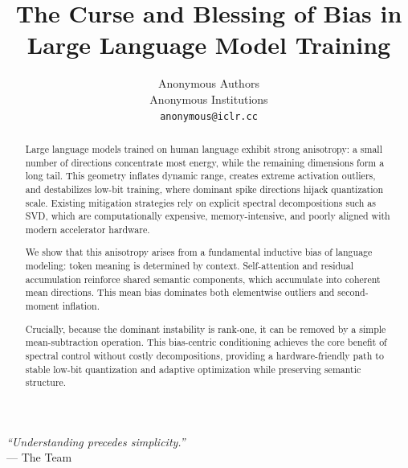 \documentclass{article}
\title{The Curse and Blessing of Bias in Large Language Model Training}
\author{
  Anonymous Authors\\
  Anonymous Institutions\\
  \texttt{anonymous@iclr.cc}
}
\begin{document}
\maketitle

\begin{abstract}

Large language models trained on human language exhibit strong anisotropy: a small number of directions concentrate most energy, while the remaining dimensions form a long tail. This geometry inflates dynamic range, creates extreme activation outliers, and destabilizes low-bit training, where dominant spike directions hijack quantization scale. Existing mitigation strategies rely on explicit spectral decompositions such as SVD, which are computationally expensive, memory-intensive, and poorly aligned with modern accelerator hardware.

We show that this anisotropy arises from a fundamental inductive bias of language modeling: token meaning is determined by context. Self-attention and residual accumulation reinforce shared semantic components, which accumulate into coherent mean directions. This mean bias dominates both elementwise outliers and second-moment inflation.

Crucially, because the dominant instability is rank-one, it can be removed by a simple mean-subtraction operation. This bias-centric conditioning achieves the core benefit of spectral control without costly decompositions, providing a hardware-friendly path to stable low-bit quantization and adaptive optimization while preserving semantic structure.

\end{abstract}

\begin{flushright}
\textit{“Understanding precedes simplicity.”}\\
--- The Team
\end{flushright}

















\newpage





\newpage

\appendix
%
\end{document}
